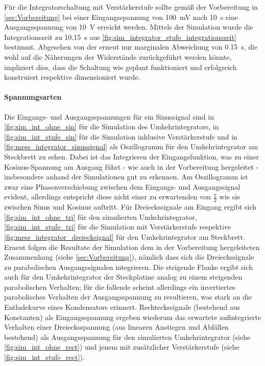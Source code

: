 \documentclass[12pt,english,ngerman]{scrartcl}
\begin{document}
Für die Integratorschaltung mit Verstärkerstufe sollte gemäß der Vorbereitung
in \autoref{sec:Vorbereitung} bei einer Eingangsspannung von
\SI{100}{\milli\volt} nach \SI{10}{\second} eine Ausgangsspannung von
\SI{10}{\volt} erreicht werden. Mittels der Simulation wurde die
Integrationszeit zu \SI{10,15}{\second} aus
\autoref{fig:sim_integrator_stufe_integrationszeit} bestimmt. Abgesehen von der
erneut nur marginalen Abweichung von \SI{0,15}{\second}, die wohl auf die
Näherungen der Widerstände zurückgeführt werden könnte, impliziert dies, dass die
Schaltung wie geplant funktioniert und erfolgreich konstruiert respektive
dimensioniert wurde.

\paragraph{Spannungsarten}
Die Eingangs- und Ausgangsspannungen für ein Sinussignal sind in \autoref{fig:sim_int_ohne_sin} für
die Simulation des Umkehrintegrators, in \autoref{fig:sim_int_stufe_sin} für die Simulation
inklusive Verstärkerstufe und in \autoref{fig:mess_integrator_sinussignal} als Oszillogramm für den
Umkehrintegrator am Steckbrett zu sehen. Dabei ist das Integrieren der Eingangsfunktion,
was zu einer Kosinus-Spannung am Ausgang führt - wie auch in der Vorbereitung hergeleitet -
insbesondere anhand der Simulationen gut zu erkennen. Am Oszillogramm ist zwar eine
Phasenverschiebung zwischen dem Eingangs- und Ausgangssignal evident, allerdings
entspricht diese nicht einer zu erwartenden von $\frac{\pi}{2}$ wie sie zwischen
Sinus und Kosinus auftritt.
\newline
Für Dreieckssignale am Eingang ergibt sich \autoref{fig:sim_int_ohne_tri} für den simulierten Umkehrintegrator, \autoref{fig:sim_int_stufe_tri} für die Simulation mit Verstärkerstufe respektive
\autoref{fig:mess_integrator_dreiecksignal} für den Umkehrintegrator am Steckbrett.
Erneut folgen die Resultate der Simulation dem in der Vorbereitung hergeleiteten Zusammenhang (siehe \autoref{sec:Vorbereitung}), nämlich dass sich die Dreieckssignale zu parabolischen Ausgangssignalen
integrieren. Die steigende Flanke ergibt sich auch für den Umkehrintegrator der Steckplatine analog
zu einem steigenden parabolischen Verhalten; für die fallende scheint allerdings ein invertiertes
parabolisches Verhalten der Ausgangsspannung zu resultieren, was stark an die Entladekurve
eines Kondensators erinnert.
\newline
Rechteckssignale (bestehend aus Konstanten) als Eingangsspannung ergeben wiederum das erwartete 
aufintegrierte Verhalten einer
Dreiecksspannung (aus linearen Anstiegen und Abfällen bestehend) als Ausgangsspannung für
den simulierten Umkehrintegrator (siehe \autoref{fig:sim_int_ohne_rect}) und jenem mit zusätzlicher Verstärkerstufe (siehe \autoref{fig:sim_int_stufe_rect}).
\end{document}
